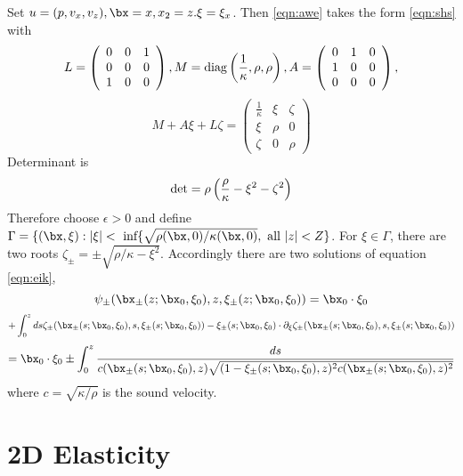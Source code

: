 Set $u=(p,v_x,v_z), \bx=x, x_2=z. \xi=\xi_x$. Then \ref{eqn:awe} takes the form \ref{eqn:shs} with
\[
  L =
  \left(
    \begin{array}{ccc}
      0 & 0 & 1\\
      0 & 0 & 0\\
      1 & 0 & 0
    \end{array}
  \right),
  M ={\rm diag}\left(\frac{1}{\kappa},\rho,\rho\right),
  A =
 \left(
    \begin{array}{ccc}
      0 & 1 & 0\\
      1 & 0 & 0\\
      0 & 0 & 0
    \end{array}
  \right),
\]
\[
  M + A\xi + L\zeta =
  \left(
    \begin{array}{ccc}
      \frac{1}{\kappa} & \xi & \zeta \\
      \xi & \rho & 0 \\
      \zeta & 0 & \rho
    \end{array}
  \right)
\]
Determinant is
\[
  {\rm det} = \rho\left(\frac{\rho}{\kappa} - \xi^2 - \zeta^2\right)
\]
Therefore choose $\epsilon > 0$ and define $\Gamma = \{(\bx,\xi): |\xi| < \mbox{ inf}\{\sqrt{\rho(\bx,0)/\kappa(\bx,0)}, \mbox{ all } |z| < Z\}$. For $\xi
\in \Gamma$, there are two roots $\zeta_{\pm} = \pm \sqrt{\rho/\kappa - \xi^2}.$
Accordingly there are two solutions of equation \ref{eqn:eik},
\[
  \psi_{\pm}(\bx_{\pm}(z;\bx_0,\xi_0),z,\xi_{\pm}(z;\bx_0,\xi_0))= \bx_0\cdot\xi_0
\]
\[
 +\int_0^z ds \zeta_{\pm}(\bx_{\pm}(s;\bx_0,\xi_0),s,\xi_{\pm}(s;\bx_0,\xi_0))-\xi_{\pm}(s;\bx_0,\xi_0)\cdot \partial_{\xi}\zeta_{\pm}(\bx_{\pm}(s;\bx_0,\xi_0),s,\xi_{\pm}(s;\bx_0,\xi_0))
\]
\[
  =\bx_0 \cdot \xi_0 \pm \int_0^z
  \frac{ds}{c(\bx_{\pm}(s;\bx_0,\xi_0),z)
    \sqrt{(1-\xi_{\pm}(s;\bx_0,\xi_0),z)^2
    c(\bx_{\pm}(s;\bx_0,\xi_0),z)^2}}
\]
where $c = \sqrt{\kappa/\rho}$ is the sound velocity.









\section{2D Elasticity}

